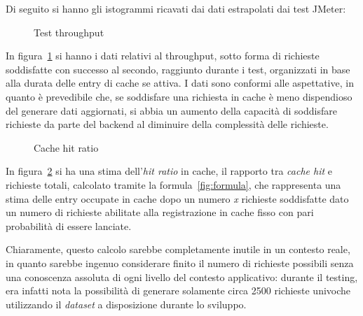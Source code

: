 Di seguito si hanno gli istogrammi ricavati dai dati estrapolati dai test JMeter: 
\begin{figure}[hbpt!]
\caption{Test throughput}
\label{fig:throughput}

\end{figure}
\FloatBarrier

In figura~\ref{fig:throughput} si hanno i dati relativi al throughput, sotto forma di richieste soddisfatte con successo al secondo, raggiunto durante i test, organizzati in base alla durata delle entry di cache se attiva.
I dati sono conformi alle aspettative, in quanto è prevedibile che, se soddisfare una richiesta in cache è meno dispendioso del generare dati aggiornati, si abbia un aumento della capacità di soddisfare richieste da parte del backend al diminuire della complessità delle richieste.



\begin{figure}[h!]

\caption{Cache hit ratio}
\label{fig:hitratio}

\end{figure}
\FloatBarrier
In figura~\ref{fig:hitratio} si ha una stima dell'\textit{hit ratio} in cache, il rapporto tra \textit{cache hit} e richieste totali, calcolato tramite la formula~\ref{fig:formula}, che rappresenta una stima delle entry occupate in cache dopo un numero \emph{x} richieste soddisfatte dato un numero di richieste abilitate alla registrazione in cache fisso con pari probabilità di essere lanciate.

Chiaramente, questo calcolo sarebbe completamente inutile in un contesto reale, in quanto sarebbe ingenuo considerare finito il numero di richieste possibili senza una conoscenza assoluta di ogni livello del contesto applicativo: durante il testing, era infatti nota la possibilità di generare solamente circa 2500 richieste univoche utilizzando il \textit{dataset} a disposizione durante lo sviluppo.

